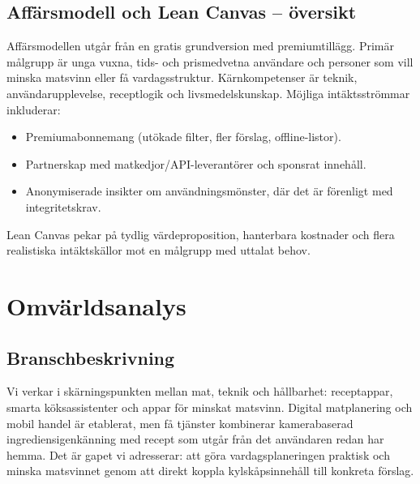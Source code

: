 \documentclass[a4paper,12pt]{article}
\begin{document}
\subsection{Affärsmodell och Lean Canvas – översikt}
Affärsmodellen utgår från en gratis grundversion med premiumtillägg. Primär målgrupp är unga vuxna, tids- och prismedvetna användare och personer som vill minska matsvinn eller få vardagsstruktur. Kärnkompetenser är teknik, användarupplevelse, receptlogik och livsmedelskunskap. Möjliga intäktsströmmar inkluderar:
\begin{itemize}
    \item Premiumabonnemang (utökade filter, fler förslag, offline-listor).
    \item Partnerskap med matkedjor/API-leverantörer och sponsrat innehåll.
    \item Anonymiserade insikter om användningsmönster, där det är förenligt med integritetskrav.
\end{itemize}
Lean Canvas pekar på tydlig värdeproposition, hanterbara kostnader och flera realistiska intäktskällor mot en målgrupp med uttalat behov.


\section{Omvärldsanalys}

\subsection{Branschbeskrivning}
Vi verkar i skärningspunkten mellan mat, teknik och hållbarhet: receptappar, smarta köksassistenter och appar för minskat matsvinn. Digital matplanering och mobil handel är etablerat, men få tjänster kombinerar kamerabaserad ingrediensigenkänning med recept som utgår från det användaren redan har hemma. Det är gapet vi adresserar: att göra vardagsplaneringen praktisk och minska matsvinnet genom att direkt koppla kylskåpsinnehåll till konkreta förslag.
\end{document}
